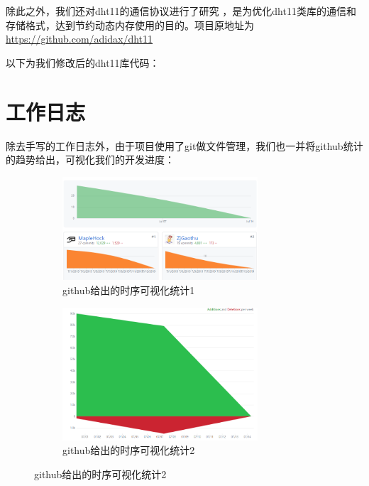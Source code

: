 \documentclass[a4paper, 11pt]{article} %
\begin{document}
除此之外，我们还对dht11的通信协议进行了研究 \cite{dht11}，是为优化dht11类库的通信和存储格式，达到节约动态内存使用的目的。项目原地址为\href{https://github.com/adidax/dht11}{https://github.com/adidax/dht11}



以下为我们修改后的dht11库代码：







\newpage
\section{工作日志}
\label{sec:log}

除去手写的工作日志外，由于项目使用了git做文件管理，我们也一并将github统计的趋势给出，可视化我们的开发进度：

\begin{figure}[H]
  \centering
  \begin{minipage}[H]{0.48\textwidth}
    \begin{figure}[H]
      \centering
      \includegraphics[width = 0.8\textwidth]{git_contributor.jpg}
      \caption{github给出的时序可视化统计1}
    \end{figure}
  \end{minipage}
  \begin{minipage}[H]{0.48\textwidth}
    \begin{figure}[H]
      \centering
      \includegraphics[width = 0.8\textwidth]{git_frequency.jpg}
      \caption{github给出的时序可视化统计2}
    \end{figure}
  \end{minipage}
\end{figure}
\end{document}
